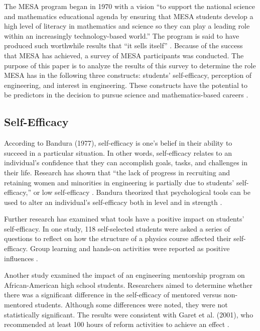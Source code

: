 \documentclass[11pt]{article}
\begin{document}
The MESA program began in 1970 with a vision “to support the national science and mathematics educational agenda by ensuring that MESA students develop a high level of literacy in mathematics and science so they can play a leading role within an increasingly technology-based world.” The program is said to have produced such worthwhile results that “it sells itself” \cite{somerton1994}. Because of the success that MESA has achieved, a survey of MESA participants was conducted. The purpose of this paper is to analyze the results of this survey to determine the role MESA has in the following three constructs: students’ self-efficacy, perception of engineering, and interest in engineering. These constructs have the potential to be predictors in the decision to pursue science and mathematics-based careers \cite{hailey2011}.

\subsection{Self-Efficacy}

According to Bandura (1977), self-efficacy is one’s belief in their ability to succeed in a particular situation. In other words, self-efficacy relates to an individual’s confidence that they can accomplish goals, tasks, and challenges in their life. Research has shown that “the lack of progress in recruiting and retaining women and minorities in engineering is partially due to students’ self-efficacy,” or low self-efficacy \cite{jordan2011}. Bandura theorized that psychological tools can be used to alter an individual’s self-efficacy both in level and in strength \cite{bandura1977}.

Further research has examined what tools have a positive impact on students’ self-efficacy. In one study, 118 self-selected students were asked a series of questions to reflect on how the structure of a physics course affected their self-efficacy. Group learning and hands-on activities were reported as positive influences \cite{gaffney2013}.

Another study examined the impact of an engineering mentorship program on African-American high school students. Researchers aimed to determine whether there was a significant difference in the self-efficacy of mentored versus non-mentored students. Although some differences were noted, they were not statistically significant. The results were consistent with Garet et al. (2001), who recommended at least 100 hours of reform activities to achieve an effect \cite{denson2010}.
\end{document}

